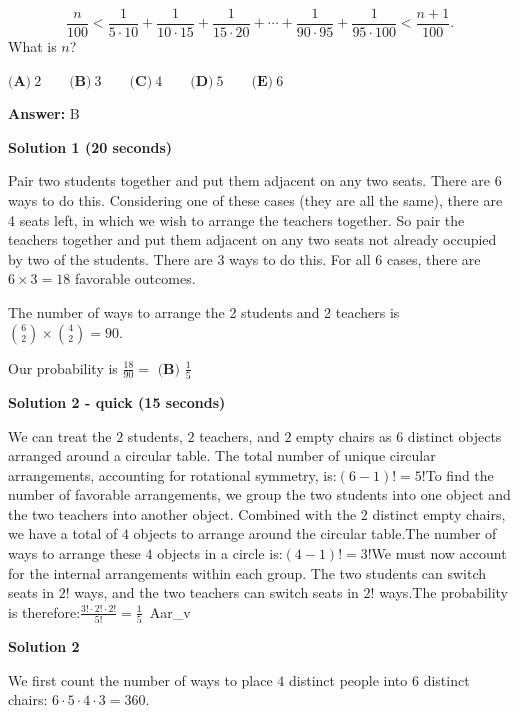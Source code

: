 \begin{enumerate}
 \[\frac{n}{100} < \frac{1}{5 \cdot 10} + \frac{1}{10 \cdot 15} + \frac{1}{15 \cdot 20} + \cdots + \frac{1}{90\cdot 95} + \frac{1}{95\cdot 100} < \frac{n+1}{100}.\]
What is $n$?


 $\textbf{(A)}\   2  \qquad                 \textbf{(B)}\   3  \qquad                 \textbf{(C)}\   4  \qquad                 \textbf{(D)}\   5  \qquad                 \textbf{(E)}\   6$

 \textbf{Answer: }B



\textbf{Solution 1 (20 seconds)}

Pair two students together and put them adjacent on any two seats. There are 6 ways to do this. Considering one of these cases (they are all the same), there are 4 seats left, in which we wish to arrange the teachers together. So pair the teachers together and put them adjacent on any two seats not already occupied by two of the students. There are 3 ways to do this. For all 6 cases, there are \( 6 \times 3 = 18 \) favorable outcomes.

 The number of ways to arrange the 2 students and 2 teachers is $\binom{6}{2} \times \binom{4}{2} = 90$.

 Our probability is \( \frac{18}{90} = \) $\boxed{\textbf{(B) } \frac 15}$




\textbf{Solution 2 - quick (15 seconds)}

We can treat the \(2\) students, \(2\) teachers, and \(2\) empty chairs as \(6\) distinct objects arranged around a circular table. The total number of unique circular arrangements, accounting for rotational symmetry, is:\((6-1)!=5!\)To find the number of favorable arrangements, we group the two students into one object and the two teachers into another object. Combined with the \(2\) distinct empty chairs, we have a total of \(4\) objects to arrange around the circular table.The number of ways to arrange these \(4\) objects in a circle is:\((4-1)!=3!\)We must now account for the internal arrangements within each group. The two students can switch seats in \(2!\) ways, and the two teachers can switch seats in \(2!\) ways.The probability is therefore:\(\frac{3!\cdot 2!\cdot 2!}{5!}=\boxed{\frac{1}{5}}\)~Aar\_v

 



\textbf{Solution 2}

We first count the number of ways to place $4$ distinct people into $6$ distinct chairs: $6\cdot5\cdot4\cdot3 = 360$.


\end{enumerate}
